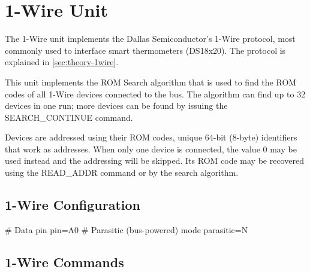 \section{1-Wire Unit}

The 1-Wire unit implements the Dallas Semiconductor's 1-Wire protocol, most commonly used to interface smart thermometers (DS18x20). The protocol is explained in \cref{sec:theory-1wire}.

This unit implements the ROM Search algorithm that is used to find the ROM codes of all 1-Wire devices connected to the bus. The algorithm can find up to 32 devices in one run; more devices can be found by issuing the SEARCH\_CONTINUE command.

Devices are addressed using their ROM codes, unique 64-bit (8-byte) identifiers that work as addresses. When only one device is connected, the value 0 may be used instead and the addressing will be skipped. Its ROM code may be recovered using the READ\_ADDR command or by the search algorithm.

\subsection{1-Wire Configuration}

\begin{inicode}
[1WIRE:ow@7]
# Data pin
pin=A0
# Parasitic (bus-powered) mode
parasitic=N
\end{inicode}

\subsection{1-Wire Commands}

